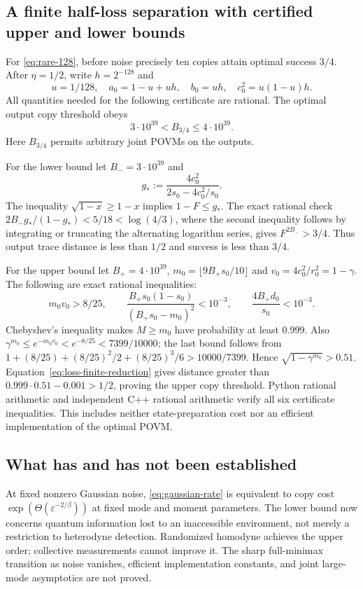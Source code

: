 \documentclass[11pt,a4paper]{article}
\numberwithin{equation}{section}
\begin{document}
\subsection{A finite half-loss separation with certified upper and lower bounds}
For \eqref{eq:rare-128}, before noise precisely ten copies attain optimal
success $3/4$. After $\eta=1/2$, write $h=2^{-128}$ and
\[
 u=1/128,\quad a_0=1-u+uh,\quad b_0=uh,\quad c_0^2=u(1-u)h.
\]
All quantities needed for the following certificate are rational.
The optimal output copy threshold obeys
\[
 \boxed{3\cdot10^{39}<B_{3/4}\le4\cdot10^{39}.}
 \tag{D.17}\label{eq:loss-128-finite}
\]
Here $B_{3/4}$ permits arbitrary joint POVMs on the outputs.

For the lower bound let $B_-=3\cdot10^{39}$ and
\[
 g_*:=\frac{4c_0^2}{2s_0-4c_0^2/s_0}.
\]
The inequality $\sqrt{1-x}\ge1-x$ implies $1-F\le g_*$.
The exact rational check
$2B_-g_* /(1-g_*)<5/18<\log(4/3)$, where the second inequality follows by
integrating or truncating the alternating logarithm series, gives
$F^{2B_-}>3/4$. Thus output trace distance is less than $1/2$ and success is
less than $3/4$.

For the upper bound let $B_+=4\cdot10^{39}$,
$m_0=\lfloor9B_+s_0/10\rfloor$ and $v_0=4c_0^2/r_0^2=1-\gamma$.
The following are exact rational inequalities:
\[
 m_0v_0>8/25,\qquad
 \frac{B_+s_0(1-s_0)}{(B_+s_0-m_0)^2}<10^{-3},\qquad
 \frac{4B_+d_0}{s_0}<10^{-3}.
\]
Chebyshev's inequality makes $M\ge m_0$ have probability at least $0.999$.
Also $\gamma^{m_0}\le e^{-m_0v_0}<e^{-8/25}<7399/10000$; the last bound
follows from
$1+(8/25)+(8/25)^2/2+(8/25)^3/6>10000/7399$.
Hence $\sqrt{1-\gamma^{m_0}}>0.51$. Equation~\eqref{eq:loss-finite-reduction}
gives distance greater than $0.999\cdot0.51-0.001>1/2$, proving the upper
copy threshold. Python rational arithmetic and independent C++ rational
arithmetic verify all six certificate inequalities. This includes neither
state-preparation cost nor an efficient implementation of the optimal POVM.

\subsection{What has and has not been established}
At fixed nonzero Gaussian noise, \eqref{eq:gaussian-rate} is equivalent to
copy cost $\exp(\Theta(\varepsilon^{-2/\beta}))$ at fixed mode and moment
parameters. The lower bound now concerns quantum information lost to an
inaccessible environment, not merely a restriction to heterodyne detection.
Randomized homodyne achieves the upper order; collective measurements cannot
improve it. The sharp full-minimax transition as noise vanishes, efficient implementation
constants, and joint large-mode asymptotics are not proved.
\end{document}

